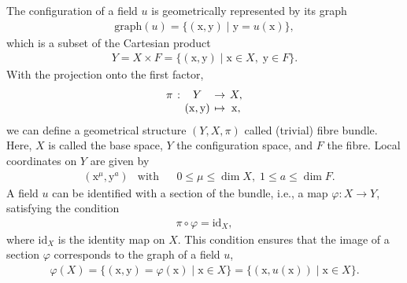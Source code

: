 \documentclass[12pt,a4paper,reqno]{article}
\begin{document}
The configuration of a field ${\ensuremath{{\ensuremath{{u}}}}}$ is geometrically represented by its graph
\begin{align*}
\mathrm{graph} ({\ensuremath{{\ensuremath{{u}}}}}) = \big\{ ({\ensuremath{{\ensuremath{\mathrm{{x}}}}}}, {\ensuremath{{\ensuremath{\mathrm{{y}}}}}}) \; \big\vert \; {\ensuremath{{\ensuremath{\mathrm{{y}}}}}} = {\ensuremath{{\ensuremath{{u}}}}}({\ensuremath{{\ensuremath{\mathrm{{x}}}}}}) \big\} ,
\end{align*}
which is a subset of the Cartesian product
\begin{align*}
Y = X \times F = \big\{ ({\ensuremath{{\ensuremath{\mathrm{{x}}}}}}, {\ensuremath{{\ensuremath{\mathrm{{y}}}}}}) \; \big\vert \; {\ensuremath{{\ensuremath{\mathrm{{x}}}}}} \in X, \; {\ensuremath{{\ensuremath{\mathrm{{y}}}}}} \in F \big\} .
\end{align*}
With the projection onto the first factor,
\begin{align*}
\arraycolsep=2pt
\begin{array}{rcccc}
\pi & : & Y & \rightarrow & X , \\
& & ({\ensuremath{{\ensuremath{\mathrm{{x}}}}}}, {\ensuremath{{\ensuremath{\mathrm{{y}}}}}}) & \mapsto & {\ensuremath{{\ensuremath{\mathrm{{x}}}}}} ,
\end{array}
\end{align*}
we can define a geometrical structure $(Y, X, \pi)$ called (trivial) fibre bundle.
Here, $X$ is called the base space, $Y$ the configuration space, and $F$ the fibre.
Local coordinates on $Y$ are given by
\begin{align*}
& ( {\ensuremath{{\ensuremath{\mathrm{{x}}}}}}^{\mu}, {\ensuremath{{\ensuremath{\mathrm{{y}}}}}}^{a} ) 
& \text{with} &
& 0 \leq \mu \leq \dim X , \; 1 \leq a \leq \dim F .
\end{align*}
A field ${\ensuremath{{\ensuremath{{u}}}}}$ can be identified with a section of the bundle, i.e., a map ${\ensuremath{\varphi}} : X \rightarrow Y$, satisfying the condition
\begin{align*}
\pi \circ {\ensuremath{\varphi}} = {\ensuremath{\mathrm{id}}}_{X} ,
\end{align*}
where ${\ensuremath{\mathrm{id}}}_{X}$ is the identity map on $X$.
This condition ensures that the image of a section ${\ensuremath{\varphi}}$ corresponds to the graph of a field ${\ensuremath{{\ensuremath{{u}}}}}$,
\begin{align*}
{\ensuremath{\varphi}} (X)
= \big\{ ({\ensuremath{{\ensuremath{\mathrm{{x}}}}}}, {\ensuremath{{\ensuremath{\mathrm{{y}}}}}}) = {\ensuremath{\varphi}} ({\ensuremath{{\ensuremath{\mathrm{{x}}}}}}) \; \big\vert \; {\ensuremath{{\ensuremath{\mathrm{{x}}}}}} \in X \big\}
= \big\{ ({\ensuremath{{\ensuremath{\mathrm{{x}}}}}}, {\ensuremath{{\ensuremath{{u}}}}} ({\ensuremath{{\ensuremath{\mathrm{{x}}}}}})) \; \big\vert \; {\ensuremath{{\ensuremath{\mathrm{{x}}}}}} \in X \big\} .
\end{align*}
\end{document}
